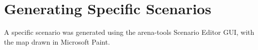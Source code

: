 \section{Generating Specific Scenarios}
A specific scenario was generated using the arena-tools \citep{tools} Scenario Editor GUI, with the map drawn in Microsoft Paint.
